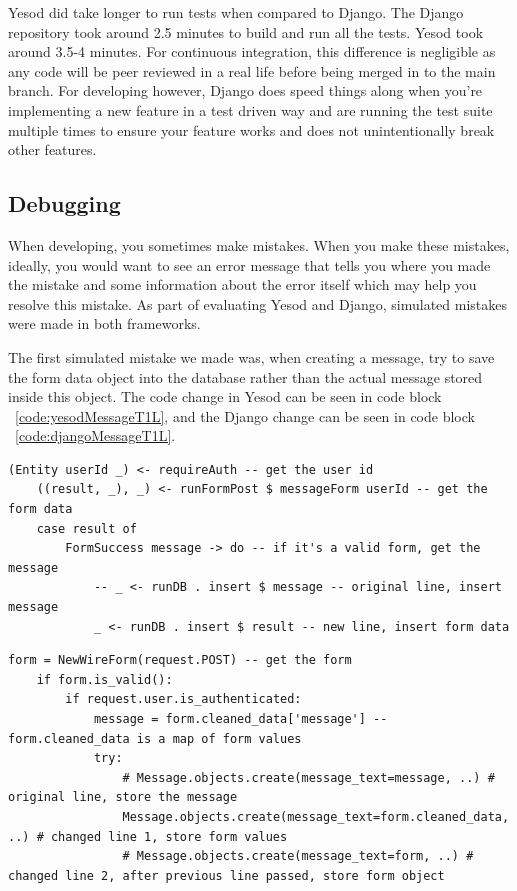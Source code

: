 Yesod did take longer to run tests when compared to Django. The Django
repository took around 2.5 minutes to build and run all the tests. Yesod
took around 3.5-4 minutes. For continuous integration, this difference
is negligible as any code will be peer reviewed in a real life before being
merged in to the main branch. For developing however, Django does speed
things along when you're implementing a new feature in a test driven way
and are running the test suite multiple times to ensure your feature
works and does not unintentionally break other features.

\subsection{Debugging}

When developing, you sometimes make mistakes. When you make these mistakes,
ideally, you would want to see an error message that tells you where you
made the mistake and some information about the error itself which may
help you resolve this mistake. As part of evaluating Yesod and Django,
simulated mistakes were made in both frameworks.

The first simulated mistake we made was, when creating a message, try
to save the form data object into the database rather than the actual
message stored inside this object. The code change in Yesod can be
seen in code block ~\ref{code:yesodMessageT1L}, and the Django change can
be seen in code block ~\ref{code:djangoMessageT1L}.


\begin{lstlisting}[caption={Yesod Code Change},label={code:yesodMessageT1L}]
	(Entity userId _) <- requireAuth -- get the user id
	((result, _), _) <- runFormPost $ messageForm userId -- get the form data
	case result of
		FormSuccess message -> do -- if it's a valid form, get the message
			-- _ <- runDB . insert $ message -- original line, insert message
			_ <- runDB . insert $ result -- new line, insert form data
\end{lstlisting}

\begin{lstlisting}[caption={Django Code Change},label={code:djangoMessageT1L}]
	form = NewWireForm(request.POST) -- get the form
	if form.is_valid():
		if request.user.is_authenticated:
			message = form.cleaned_data['message'] -- form.cleaned_data is a map of form values
			try:
				# Message.objects.create(message_text=message, ..) # original line, store the message
				Message.objects.create(message_text=form.cleaned_data, ..) # changed line 1, store form values
				# Message.objects.create(message_text=form, ..) # changed line 2, after previous line passed, store form object
\end{lstlisting}

